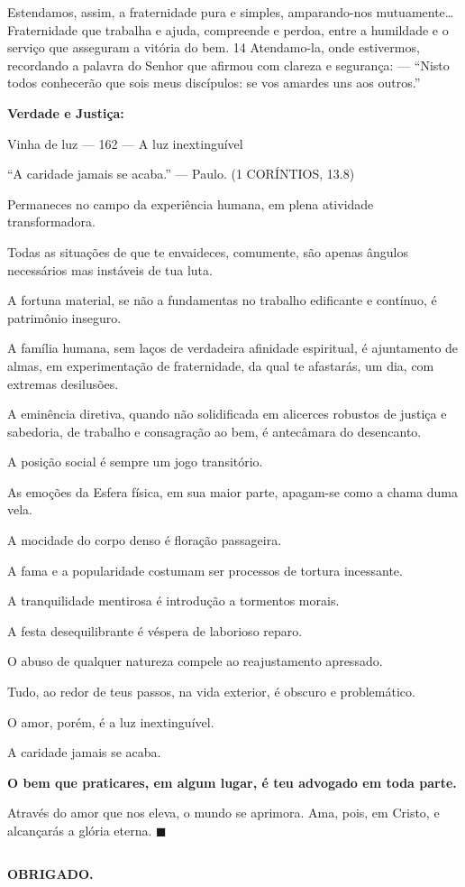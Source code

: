 \documentclass{rbfin}
\begin{document}
\begin{multicols}{2}
Estendamos, assim, a fraternidade pura e simples, amparando-nos mutuamente… Fraternidade que trabalha e ajuda, compreende e perdoa, entre a humildade e o serviço que asseguram a vitória do bem. 14 Atendamo-la, onde estivermos, recordando a palavra do Senhor que afirmou com clareza e segurança: — “Nisto todos conhecerão que sois meus discípulos: se vos amardes uns aos outros.”

\dotfill

\textbf{Verdade e Justiça:}

Vinha de luz — 162 --- A luz inextinguível

“A caridade jamais se acaba.” — Paulo. (1 CORÍNTIOS, 13.8)

Permaneces no campo da experiência humana, em plena atividade transformadora.

Todas as situações de que te envaideces, comumente, são apenas ângulos necessários mas instáveis de tua luta.

A fortuna material, se não a fundamentas no trabalho edificante e contínuo, é patrimônio inseguro.

A família humana, sem laços de verdadeira afinidade espiritual, é ajuntamento de almas, em experimentação de fraternidade, da qual te afastarás, um dia, com extremas desilusões.

\newpage

A eminência diretiva, quando não solidificada em alicerces robustos de justiça e sabedoria, de trabalho e consagração ao bem, é antecâmara do desencanto.

A posição social é sempre um jogo transitório.

As emoções da Esfera física, em sua maior parte, apagam-se como a chama duma vela.

A mocidade do corpo denso é floração passageira.

A fama e a popularidade costumam ser processos de tortura incessante.

A tranquilidade mentirosa é introdução a tormentos morais.

A festa desequilibrante é véspera de laborioso reparo.

O abuso de qualquer natureza compele ao reajustamento apressado.

Tudo, ao redor de teus passos, na vida exterior, é obscuro e problemático.

O amor, porém, é a luz inextinguível.

A caridade jamais se acaba.

\textbf{O bem que praticares, em algum lugar, é teu advogado em toda parte.}

Através do amor que nos eleva, o mundo se aprimora. Ama, pois, em Cristo, e alcançarás a glória eterna. $\blacksquare$
\end{multicols}

\newpage

$\,$

\vspace{75mm}

\begin{center}
\textbf{OBRIGADO.}
\end{center}
\end{document}
